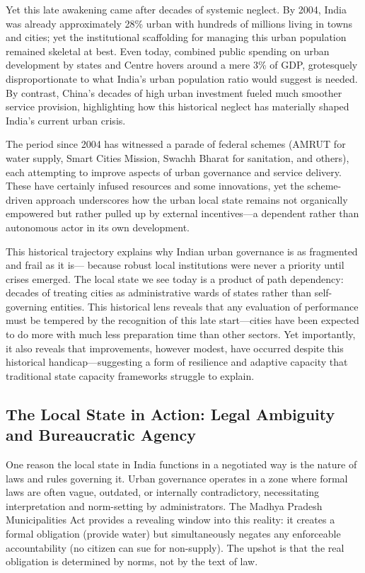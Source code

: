 Yet this late awakening came after decades of systemic neglect. By 2004, India was already approximately 28\% urban with hundreds of millions living in towns and cities; yet the institutional scaffolding for managing this urban population remained skeletal at best. Even today, combined public spending on urban development by states and Centre hovers around a mere 3\% of GDP, grotesquely disproportionate to what India's urban population ratio would suggest is needed. By contrast, China's decades of high urban investment fueled much smoother service provision, highlighting how this historical neglect has materially shaped India's current urban crisis.

The period since 2004 has witnessed a parade of federal schemes (AMRUT for water supply, Smart Cities Mission, Swachh Bharat for sanitation, and others), each attempting to improve aspects of urban governance and service delivery. These have certainly infused resources and some innovations, yet the scheme-driven approach underscores how the urban local state remains not organically empowered but rather pulled up by external incentives—a dependent rather than autonomous actor in its own development.

This historical trajectory explains why Indian urban governance is as fragmented and frail as it is— because robust local institutions were never a priority until crises emerged. The local state we see today is a product of path dependency: decades of treating cities as administrative wards of states rather than self-governing entities. This historical lens reveals that any evaluation of performance must be tempered by the recognition of this late start—cities have been expected to do more with much less preparation time than other sectors. Yet importantly, it also reveals that improvements, however modest, have occurred despite this historical handicap—suggesting a form of resilience and adaptive capacity that traditional state capacity frameworks struggle to explain.

\subsection{The Local State in Action: Legal Ambiguity and Bureaucratic Agency}

One reason the local state in India functions in a negotiated way is the nature of laws and rules governing it. Urban governance operates in a zone where formal laws are often vague, outdated, or internally contradictory, necessitating interpretation and norm-setting by administrators. The Madhya Pradesh Municipalities Act provides a revealing window into this reality: it creates a formal obligation (provide water) but simultaneously negates any enforceable accountability (no citizen can sue for non-supply). The upshot is that the real obligation is determined by norms, not by the text of law.

